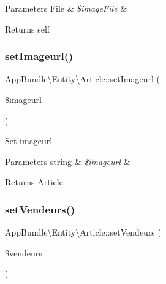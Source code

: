\begin{DoxyParams}[1]{Parameters}
File & {\em \$image\+File} & \\
\hline
\end{DoxyParams}
\begin{DoxyReturn}{Returns}
self 
\end{DoxyReturn}
\mbox{\label{class_app_bundle_1_1_entity_1_1_article_a0b3027f00ceefc77c43b349dac51732e}} 
\subsubsection{\texorpdfstring{set\+Imageurl()}{setImageurl()}}
{\footnotesize\ttfamily App\+Bundle\textbackslash{}\+Entity\textbackslash{}\+Article\+::set\+Imageurl (\begin{DoxyParamCaption}\item[{}]{\$imageurl }\end{DoxyParamCaption})}

Set imageurl


\begin{DoxyParams}[1]{Parameters}
string & {\em \$imageurl} & \\
\hline
\end{DoxyParams}
\begin{DoxyReturn}{Returns}
\hyperlink{class_app_bundle_1_1_entity_1_1_article}{Article} 
\end{DoxyReturn}
\mbox{\label{class_app_bundle_1_1_entity_1_1_article_a1252b99a36208743907df415fe555c36}} 
\subsubsection{\texorpdfstring{set\+Vendeurs()}{setVendeurs()}}
{\footnotesize\ttfamily App\+Bundle\textbackslash{}\+Entity\textbackslash{}\+Article\+::set\+Vendeurs (\begin{DoxyParamCaption}\item[{}]{\$vendeurs }\end{DoxyParamCaption})}


